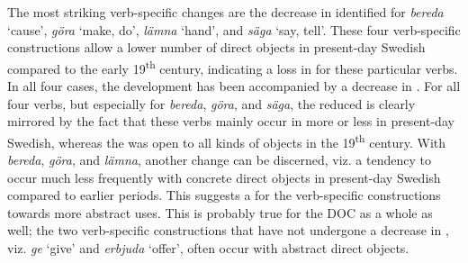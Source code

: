 \documentclass[output=paper]{langscibook}
\begin{document}
The most striking verb-specific changes are the decrease in  identified for \textit{bereda} ‘cause’, \textit{göra} ‘make, do’, \textit{lämna} ‘hand’, and \textit{säga} ‘say, tell’. These four verb-specific constructions allow a lower number of direct objects in present-day Swedish compared to the early 19\textsuperscript{th} century, indicating a loss in  for these particular verbs. In all four cases, the development has been accompanied by a decrease in . For all four verbs, but especially for \textit{bereda}, \textit{göra}, and \textit{säga}, the reduced  is clearly mirrored by the fact that these verbs mainly occur in more or less  in present-day Swedish, whereas the  was open to all kinds of objects in the 19\textsuperscript{th} century. With \textit{bereda}, \textit{göra}, and \textit{lämna}, another change can be discerned, viz. a tendency to occur much less frequently with concrete direct objects in present-day Swedish compared to earlier periods. This suggests a  for the verb-specific constructions towards more abstract uses. This is probably true for the DOC as a whole as well; the two verb-specific constructions that have not undergone a decrease in , viz. \textit{ge} ‘give’ and \textit{erbjuda} ‘offer’, often occur with abstract direct objects.
\end{document}
